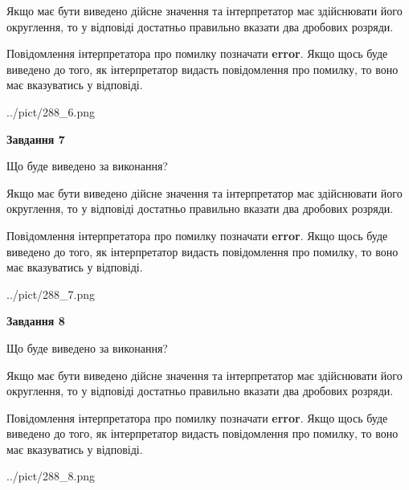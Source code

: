 \documentclass[12pt, ukrainian]{article}
\begin{document}
{\begin {Large}
Якщо має бути виведено дійсне значення та інтерпретатор має здійснювати його округлення, 
то у відповіді достатньо правильно вказати два дробових розряди.

Повідомлення інтерпретатора про помилку позначати \textbf{error}.
Якщо щось буде виведено до того, як інтерпретатор видасть повідомлення про помилку, 
то воно має вказуватись у відповіді. \par

\begin{center}
	{../pict/288_6.png}
\end{center}
\newpage

{\begin {center}\textbf{Завдання 7}\end {center}}\par
Що буде виведено за виконання? \par

Якщо має бути виведено дійсне значення та інтерпретатор має здійснювати його округлення, 
то у відповіді достатньо правильно вказати два дробових розряди.

Повідомлення інтерпретатора про помилку позначати \textbf{error}.
Якщо щось буде виведено до того, як інтерпретатор видасть повідомлення про помилку, 
то воно має вказуватись у відповіді. \par

\begin{center}
	{../pict/288_7.png}
\end{center}
\newpage

{\begin {center}\textbf{Завдання 8}\end {center}}\par
Що буде виведено за виконання? \par

Якщо має бути виведено дійсне значення та інтерпретатор має здійснювати його округлення, 
то у відповіді достатньо правильно вказати два дробових розряди.

Повідомлення інтерпретатора про помилку позначати \textbf{error}.
Якщо щось буде виведено до того, як інтерпретатор видасть повідомлення про помилку, 
то воно має вказуватись у відповіді. \par

\begin{center}
	{../pict/288_8.png}
\end{center}
\newpage


\end{Large}}
\end{document}
